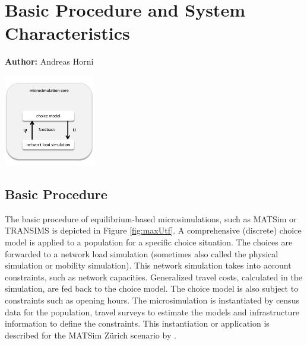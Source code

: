 \chapter{Basic Procedure and System Characteristics}
\label{ch:basicprocedure}
\hfill \textbf{Author:} Andreas Horni 

\begin{center} \includegraphics[width=0.3\textwidth, angle=0]{understanding/figures/fixedpoint.pdf} \end{center}

\section{Basic Procedure}
The basic procedure of equilibrium-based microsimulations, such as MATSim or TRANSIMS is depicted in Figure \ref{fig:maxUtf}. A comprehensive (discrete) choice model is applied to a population for a specific choice situation. The choices are forwarded to a network load simulation (sometimes also called the physical simulation or mobility simulation). This network simulation takes into account constraints, such as network capacities. Generalized travel costs, calculated in the simulation, are fed back to the choice model. The choice model is also subject to constraints such as opening hours. The microsimulation is instantiated by census data for the population, travel surveys to estimate the models and infrastructure information to define the constraints. This instantiation or application is described for the MATSim Zürich scenario by  \citet[][]{HorniEtAl_TechRep_IVT_2011_a}. %

